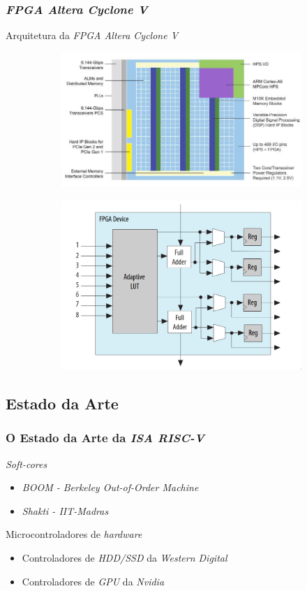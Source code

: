 \documentclass[aspectratio=169]{beamer}
\begin{document}
    \begin{frame}
        \frametitle{\textit{FPGA Altera Cyclone V}}
        \vfill
        \begin{block}{Arquitetura da \textit{FPGA Altera Cyclone V}}
        \begin{figure}[H]
            \begin{subfigure}
            \centering
                \includegraphics[width=.5\textwidth,height=.5\textheight,keepaspectratio]{../images/altera_cyclone_v_soc_architectural_downscale.jpg}
            \end{subfigure}
            \begin{subfigure}
            \centering
                \includegraphics[width=.4\textwidth,height=.5\textheight,keepaspectratio]{../images/intel_alm_high_level.png}
            \end{subfigure}
        \end{figure}
        \end{block}
        \vfill
    \end{frame}

    \subsection{Estado da Arte}
    \begin{frame}
        \frametitle{O Estado da Arte da \textit{ISA RISC-V}}
        \vfill
        \begin{block}{\textit{Soft-cores}}
            \begin{itemize}
                \item \textit{BOOM - Berkeley Out-of-Order Machine}
                \item \textit{Shakti - IIT-Madras}
            \end{itemize}
        \end{block}
        \vfill
        \begin{block}{Microcontroladores de \textit{hardware}}
            \begin{itemize}
                \item Controladores de \textit{HDD/SSD} da \textit{Western Digital}
                \item Controladores de \textit{GPU} da \textit{Nvidia}
            \end{itemize}
        \end{block}
        \vfill
    \end{frame}
\end{document}
